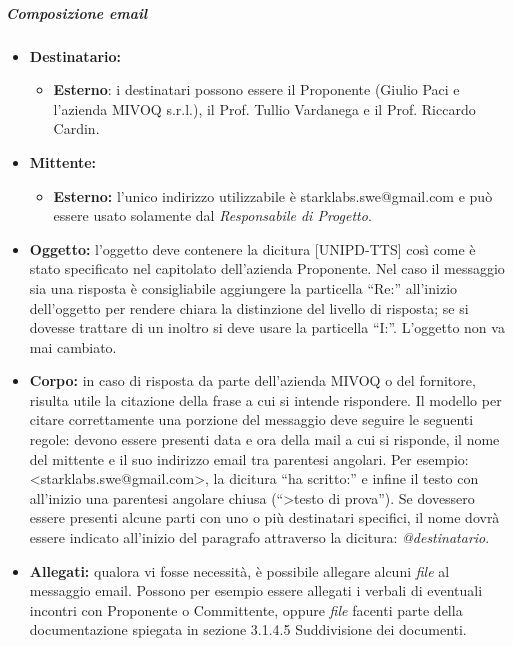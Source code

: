 \subparagraph{Composizione email}
\begin{itemize}
\item \textbf{Destinatario:}
\begin{itemize}
\item \textbf{Esterno}: i destinatari possono essere il Proponente (Giulio 
	Paci e l'azienda MIVOQ s.r.l.), il Prof. Tullio Vardanega e il Prof. Riccardo 
	Cardin.
\end{itemize}
\item \textbf{Mittente:}
\begin{itemize}
\item \textbf{Esterno:} l'unico indirizzo utilizzabile è 
	starklabs.swe@gmail.com e può essere usato solamente dal \textit{Responsabile di Progetto}.
\end{itemize}

\item \textbf{Oggetto:} l'oggetto deve contenere la dicitura [UNIPD-TTS] così come è stato specificato nel capitolato dell'azienda Proponente. Nel caso il messaggio sia una risposta è consigliabile aggiungere la particella “Re:” all'inizio dell'oggetto per rendere chiara la distinzione del livello di risposta; se si dovesse trattare di un inoltro si deve usare la particella “I:”. L'oggetto non va mai cambiato.

\item \textbf{Corpo:} in caso di risposta da parte dell'azienda MIVOQ o del fornitore,
risulta utile la citazione della frase a cui si intende rispondere. Il modello 
per citare correttamente una porzione del messaggio deve seguire le seguenti regole: devono essere presenti data e ora della mail a cui si risponde, il nome del mittente e il suo 
indirizzo email tra parentesi angolari. Per esempio: <starklabs.swe@gmail.com>, 
la dicitura “ha scritto:” e infine il testo con all'inizio una parentesi angolare chiusa (“>testo di prova”). 
Se dovessero essere presenti alcune parti con uno o 
più destinatari specifici, il nome dovrà essere indicato all'inizio del paragrafo attraverso la dicitura: \textit{@destinatario}.

\item \textbf{Allegati:} qualora vi fosse necessità, è possibile allegare alcuni \textit{file} al 
messaggio email. Possono per esempio essere allegati i verbali di eventuali incontri con 
Proponente o Committente, oppure \textit{file} facenti parte della documentazione spiegata in sezione 3.1.4.5 Suddivisione dei documenti.

\end{itemize}


